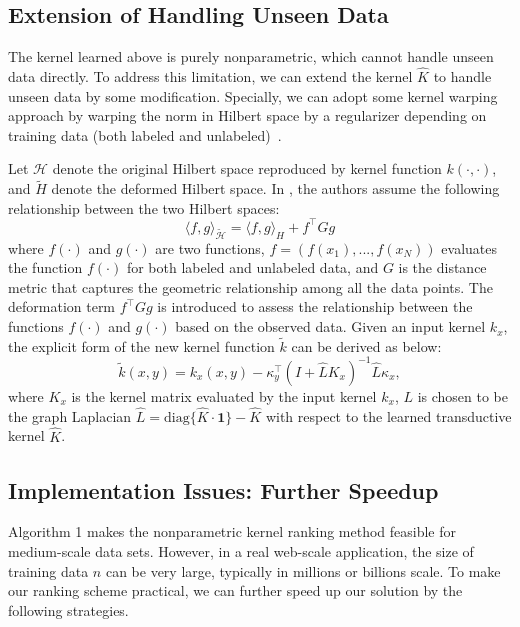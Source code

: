 \subsection{Extension of Handling Unseen Data}

The kernel learned above is purely nonparametric, which cannot handle unseen data directly. To address this limitation, we can extend the kernel $\widehat{K}$ to handle unseen data by some modification. Specially, we can adopt some kernel warping approach by warping the norm in Hilbert space by a
regularizer depending on training data (both labeled and unlabeled)~\cite{icml/SindhwaniNB05}.

Let $\mathcal H$ denote the original Hilbert space reproduced by kernel function $k(\cdot, \cdot)$, and $\widetilde{H}$ denote the deformed Hilbert space. In \cite{icml/SindhwaniNB05}, the authors assume the following relationship between the two Hilbert spaces:
\[
\langle f, g \rangle_{\widetilde{\mathcal H}} = \langle f, g \rangle_H + f^\top Gg
\]
where $f(\cdot)$ and $g(\cdot)$ are two functions, $f = (f(x_1), . . . , f(x_N))$
evaluates the function $f(\cdot)$ for both labeled and unlabeled data, and $G$ is the
distance metric that captures the geometric relationship among all the data points. The
deformation term $f^\top Gg$ is introduced to assess the relationship between the
functions $f(\cdot)$ and $g(\cdot)$ based on the observed data. Given an input kernel
$k_x$, the explicit form of the new kernel function $\tilde{k}$ can be derived as
below:
\begin{equation}
\tilde{k}(x, y) = k_x(x, y) - \kappa_y^\top(I + \widehat LK_x)^{-1}\widehat L\kappa_x, \label{eqn:kernel}
\end{equation}
where $K_x$ is the kernel matrix evaluated by the input kernel $k_x$, $L$ is chosen
to be the graph Laplacian $\widehat L = \mbox{diag}\{\widehat{K}\cdot\mathbf 1\}
- \widehat{K}$ with respect to the learned transductive kernel $\widehat{K}$.

\subsection{Implementation Issues: Further Speedup} \label{sec:rerank-implementation}

Algorithm 1 makes the nonparametric kernel ranking method feasible for
medium-scale data sets. However, in a real web-scale application, the size
of training data $n$ can be very large, typically in millions or billions scale. To make our ranking scheme practical, we can further speed up our solution by the following strategies.%

